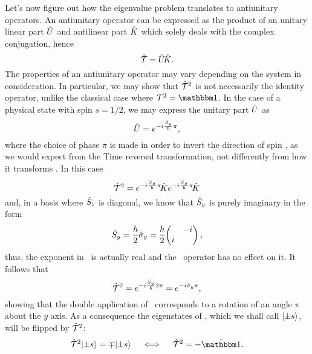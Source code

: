             Let's now figure out how the eigenvalue problem translates to antiunitary operators. An antiunitary operator can be expressed \cite{Sakurai2020-pu} as the product of an unitary linear part $\hat{U}$ and antilinear part $\hat{K}$ which solely deals with the complex conjugation, hence
            \begin{equation}
                \label{eq:antiunitary-operator}
                \mathcal{\hat{T}} = \hat{U}\!\hat{K}
                \text{.}
            \end{equation}
            The properties of an antiunitary operator may vary depending on the system in consideration. In particular, we may show that $\mathcal{\hat{T}}^2$ is not necessarily the identity operator, unlike the classical case where $\mcT^2 = \idM$. In the case of a physical state with spin $s = 1/2$, we may express the unitary part $\hat{U}$ as
            \begin{equation*}
                \hat{U} = e^{-i \frac{\hat{S}_y}{\hbar} \pi}
                \text{,}
            \end{equation*}
            where the choice of phase $\pi$ is made in order to invert the direction of spin \hvS, as we would expect from the Time reversal transformation, not differently from how it transforms \hvp. In this case
            \begin{equation*}
                \mathcal{\hat{T}}^2 = e^{-i \frac{\hat{S}_y}{\hbar} \pi}\! \hat{K} e^{-i \frac{\hat{S}_y}{\hbar} \pi}\! \hat{K}
            \end{equation*}
            and, in a basis where $\hat{S}_z$ is diagonal, we know that $\hat{S}_y$ is purely imaginary in  the form
            \begin{equation*}
                \hSy
                = \frac{\hbar}{2} \togglehat{\sigma}_y
                = \frac{\hbar}{2} \!\pmqty{\admat{-i,i}}
                \mycomma
            \end{equation*}
            thus, the exponent in \hU\ is actually real and the \hK\ operator has no effect on it. It follows that
            \begin{equation*}
                \mathcal{\hat{T}}^2
                = e^{-i \frac{\hat{S}_y}{\hbar} 2\pi}
                = e^{-i \hat{\sigma}_y \pi}
                \text{,}
            \end{equation*}
            showing that the double application of \hT\ corresponds to a rotation of an angle $\pi$ about the $y$ axis. As a consequence the eigenstates of \hSz, which we shall call $\ket{\pm s}$, will be flipped by $\mathcal{\hat{T}}^2$:
            \begin{equation*}
                \hT^2 \!\ket{\pm s} = \mp\! \ket{\pm s}
                \quad\iff\quad
                \hT^2 = -\togglehat{\idM}
                \myperiod
            \end{equation*}
